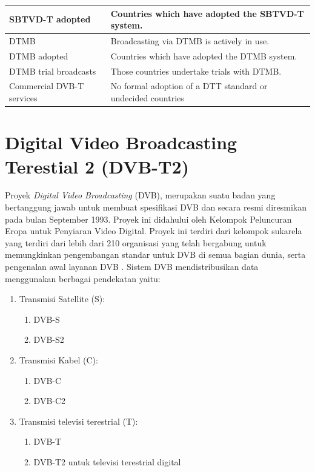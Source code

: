 \begin{singlespace}
\begin{table}[H]
\begin{tabular}{|p{3cm}|p{10cm}|}
			\rowcolor[HTML]{F4AFF8} 
			SBTVD-T adopted & Countries which have adopted the SBTVD-T system. \\ \hline
			\rowcolor[HTML]{FD9D1F} 
			{\color[HTML]{FFFFFF} DTMB} & {\color[HTML]{FFFFFF} Broadcasting via DTMB is actively in use.} \\ \hline
			\rowcolor[HTML]{FDC070} 
			DTMB adopted & Countries which have adopted the DTMB system. \\ \hline
			\rowcolor[HTML]{FDDFB8} 
			DTMB trial broadcasts & Those countries undertake trials with DTMB. \\ \hline
			\rowcolor[HTML]{DEDEDE} 
			Commercial DVB-T services & No formal adoption of a DTT standard or undecided countries \\ \hline
		\end{tabular}
	\end{table}
\end{singlespace}


\section{Digital Video Broadcasting Terestial 2 (DVB-T2)}
\hspace{1,2cm}Proyek\textit{ Digital Video Broadcasting} (DVB), merupakan suatu badan yang bertanggung jawab untuk membuat spesifikasi DVB dan secara resmi diresmikan pada bulan September 1993. Proyek ini didahului oleh Kelompok Peluncuran Eropa untuk Penyiaran Video Digital. Proyek ini terdiri dari kelompok sukarela yang terdiri dari lebih dari 210 organisasi yang telah bergabung untuk memungkinkan pengembangan standar untuk DVB di semua bagian dunia, serta pengenalan awal layanan DVB \citep{Reimers_1998}. Sistem DVB mendistribusikan data menggunakan berbagai pendekatan yaitu:
\begin{enumerate}
	\item Transmisi Satellite (S):
		\begin{enumerate}[label=(\alph*)]
			\item DVB-S
			\item DVB-S2
		\end{enumerate}
	\item Transmisi Kabel (C):
		\begin{enumerate}[label=(\alph*)]
			\item DVB-C
			\item DVB-C2
		\end{enumerate} 
	\item Transmisi televisi terestrial (T): 
		\begin{enumerate}[label=(\alph*)]
			\item DVB-T
			\item DVB-T2 untuk televisi terestrial digital  
		\end{enumerate}
\end{enumerate}

